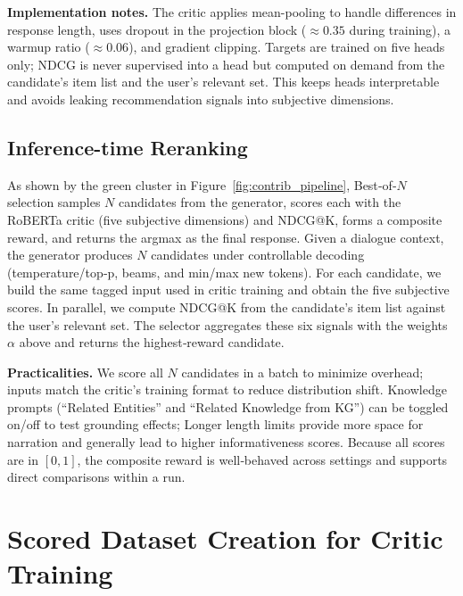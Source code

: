 \documentclass[12pt]{article}
\begin{document}
  \newline
  \newline
  \textbf{Implementation notes.} The critic applies mean-pooling to handle differences in response length, uses dropout in the projection block (\(\approx0.35\) during training), a warmup ratio (\(\approx0.06\)), and gradient clipping. Targets are trained on five heads only; NDCG is never supervised into a head but computed on demand from the candidate's item list and the user's relevant set. This keeps heads interpretable and avoids leaking recommendation signals into subjective dimensions.
  
  \subsection{Inference-time Reranking}
  \noindent As shown by the green cluster in Figure~\ref{fig:contrib_pipeline}, Best‑of‑$N$ selection samples $N$ candidates from the generator, scores each with the RoBERTa critic (five subjective dimensions) and NDCG@K, forms a composite reward, and returns the argmax as the final response.
  \newline
  Given a dialogue context, the generator produces $N$ candidates under controllable decoding (temperature/top‑p, beams, and min/max new tokens). For each candidate, we build the same tagged input used in critic training and obtain the five subjective scores. In parallel, we compute NDCG@K from the candidate's item list against the user's relevant set. The selector aggregates these six signals with the weights $\alpha$ above and returns the highest‑reward candidate.

  \textbf{Practicalities.} We score all $N$ candidates in a batch to minimize overhead; inputs match the critic's training format to reduce distribution shift. Knowledge prompts (``Related Entities'' and ``Related Knowledge from KG'') can be toggled on/off to test grounding effects; Longer length limits provide more space for narration and generally lead to higher informativeness scores. Because all scores are in $[0,1]$, the composite reward is well‑behaved across settings and supports direct comparisons within a run.
  
  \section{Scored Dataset Creation for Critic Training}
\end{document}
